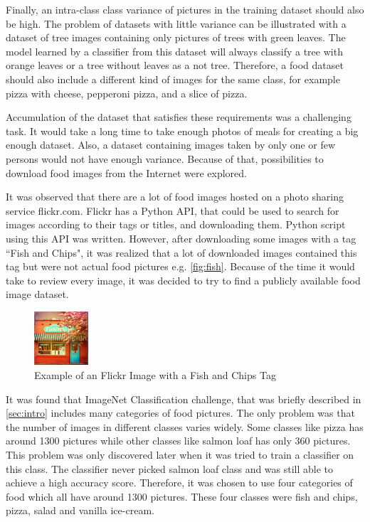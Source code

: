Finally, an intra-class class variance of pictures in the training dataset should also be high. The problem of datasets with little variance can be illustrated with a dataset of tree images containing only pictures of trees with green leaves. The model learned by a classifier from this dataset will always classify a tree with orange leaves or a tree without leaves as a not tree. Therefore, a food dataset should also include a different kind of images for the same class, for example pizza with cheese, pepperoni pizza, and a slice of pizza. 

Accumulation of the dataset that satisfies these requirements was a challenging task. It would take a long time to take enough photos of meals for creating a big enough dataset. Also, a dataset containing images taken by only one or  few persons would not have enough variance. Because of that, possibilities to download food images from the Internet were explored.


It was observed that there are a lot of food images hosted on a photo sharing service flickr.com. Flickr has a Python API, that could be used to search for images according to their tags or titles, and  downloading them. Python script using this API was written. However, after downloading some images with a tag ``Fish and Chips",  it was realized that  a lot of downloaded images  contained this tag but were not actual food pictures e.g. \autoref{fig:fish}. Because of the time it would take to review every image, it was decided to try to find a publicly available food image dataset.  


\begin{figure}[ht]
\centering
\includegraphics[width=2cm]{Figures/c3/flick.jpg}
\caption{Example of an Flickr Image with a Fish and Chips Tag}
\label{fig:fish}
\end{figure}


It was found that ImageNet Classification challenge, that was briefly described in \autoref{sec:intro}  includes many categories of food pictures. The only problem was that the number of images in different classes varies widely. Some classes like pizza has around 1300 pictures while other classes like salmon loaf has only 360 pictures. This problem was only discovered later when it was tried to train a classifier on this class. The classifier never picked salmon loaf class and was still able to achieve a high accuracy score. Therefore, it was chosen to use four categories of food which all have around 1300 pictures. These four classes were fish and chips, pizza, salad and vanilla ice-cream. 


